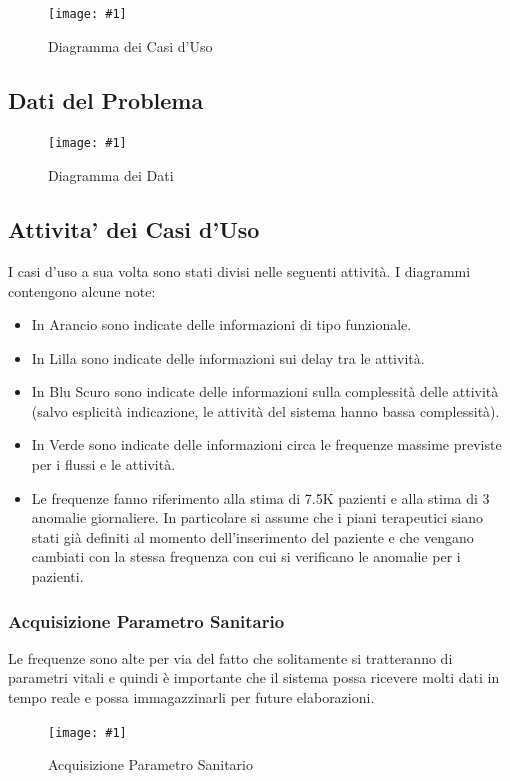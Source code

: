 \documentclass[a4paper,11pt,oneside, table]{article}
\newcommand{\putimage}[4] {
	\begin{figure}[H]
	    \centering
	    \texttt{[image: \#1]}
	    \caption{#2}\label{#3}
	\end{figure}
}
\begin{document}
\putimage{images/Diagramma dei Casi d'Uso.png}{Diagramma dei Casi d'Uso}{png:diagramma-dei-casi-duso}{1}

\subsection{Dati del Problema}

\putimage{images/Diagramma dei Dati.png}{Diagramma dei Dati}{png:diagramma-dei-dati}{1}

\subsection{Attivita' dei Casi d'Uso}

I casi d'uso a sua volta sono stati divisi nelle seguenti attivit\`a. I diagrammi contengono alcune note:

\begin{itemize}
  \item In Arancio sono indicate delle informazioni di tipo funzionale.
  \item In Lilla sono indicate delle informazioni sui delay tra le attivit\`a.
  \item In Blu Scuro sono indicate delle informazioni sulla complessit\`a delle attivit\`a (salvo esplicit\`a indicazione, le attivit\`a del sistema hanno bassa complessit\`a).
  \item In Verde sono indicate delle informazioni circa le frequenze massime previste per i flussi e le attivit\`a.
  \item Le frequenze fanno riferimento alla stima di 7.5K pazienti e alla stima di 3 anomalie giornaliere. In particolare si assume che i piani terapeutici siano stati gi\`a definiti al momento dell'inserimento del paziente e che vengano cambiati con la stessa frequenza con cui si verificano le anomalie per i pazienti.
\end{itemize}

\subsubsection{Acquisizione Parametro Sanitario}

Le frequenze sono alte per via del fatto che solitamente si tratteranno di parametri vitali e quindi \`e importante che il sistema possa ricevere molti dati in tempo reale e possa immagazzinarli per future elaborazioni.

\putimage{images/Diagramma delle Attivita'/Acquisizione Parametro Sanitario.png}{Acquisizione Parametro Sanitario}{png:act:acquisizione-parametro-sanitario}{1}
\end{document}
